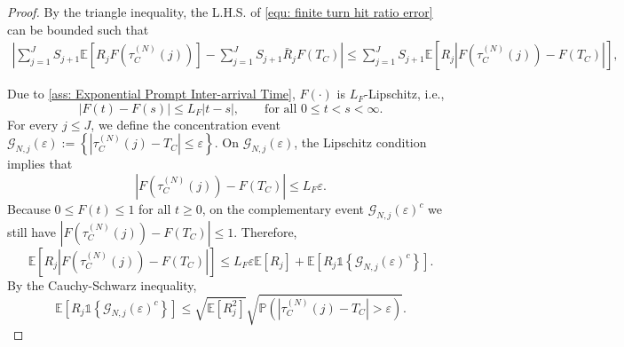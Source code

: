 \documentclass{article}
\theoremstyle{definition}
\newcommand{\E}{\mathbb E}
\newcommand{\pro}{\mathbb P}
\newcommand{\one}{\mathds{1}}
\begin{document}
\begin{proof}
    By the triangle inequality, the L.H.S. of \eqref{equ: finite turn hit ratio error} can be bounded such that
    \begin{align*}
        \left|\sum_{j=1}^{J}S_{j+1}\E\left[R_jF\left(\tau_C^{(N)}(j)\right)\right]-\sum_{j=1}^{J}S_{j+1}\bar R_jF(T_C)\right| \leq\sum_{j=1}^{J}S_{j+1}\E\left[R_j\left|F\left(\tau_C^{(N)}(j)\right)-F(T_C)\right|\right],
    \end{align*}

    Due to \cref{ass: Exponential Prompt Inter-arrival Time}, $F(\cdot)$ is $L_F$-Lipschitz, i.e.,
    \begin{equation*}
        |F(t)-F(s)|\leq L_F|t-s|, \qquad \text{for all } 0\leq t<s<\infty.
    \end{equation*}
    For every $j\leq J$, we define the concentration event $\mathcal G_{N,j}(\varepsilon):=\left\{\left|\tau_C^{(N)}(j)-T_C\right|\leq\varepsilon\right\}$. On $\mathcal G_{N,j}(\varepsilon)$, the Lipschitz condition implies that
    \begin{equation*}
        \left|F\left(\tau_C^{(N)}(j)\right)-F(T_C)\right|\leq L_F\varepsilon.
    \end{equation*}
    Because $0\leq F(t)\leq1$ for all $t\geq0$, on the complementary event $\mathcal G_{N,j}(\varepsilon)^c$ we still have $\left|F\left(\tau_C^{(N)}(j)\right)-F(T_C)\right|\leq1$. Therefore,
    \begin{equation*}
        \E\left[R_j\left|F\left(\tau_C^{(N)}(j)\right)-F(T_C)\right|\right]
        \leq L_F\varepsilon\E[R_j]+\E\left[R_j\one\left\{\mathcal G_{N,j}(\varepsilon)^c\right\}\right].
    \end{equation*}
    By the Cauchy-Schwarz inequality,
    \begin{equation*}
        \E\left[R_j\one\left\{\mathcal G_{N,j}(\varepsilon)^c\right\}\right]
        \leq\sqrt{\E[R_j^2]}\sqrt{\pro\left(\left|\tau_C^{(N)}(j)-T_C\right|>\varepsilon\right)}.
    \end{equation*}


\end{proof}
\end{document}
